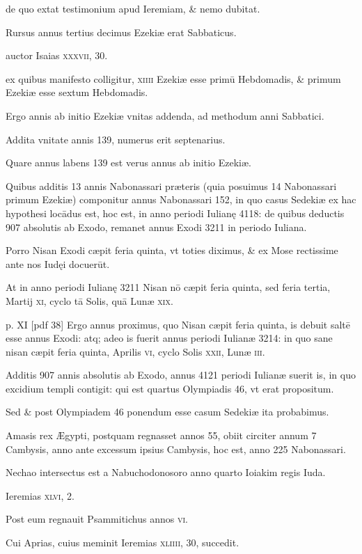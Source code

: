 \begin{parnumbers}
de quo extat testimonium
apud Ieremiam, \& nemo dubitat.

Rursus annus tertius decimus
Ezekiæ erat Sabbaticus. 

auctor Isaias \textsc{xxxvii}, 30.

ex quibus
manifesto colligitur, \textsc{xiiii} Ezekiæ esse primū Hebdomadis, \& primum
Ezekiæ esse sextum Hebdomadis. 

Ergo annis ab initio Ezekiæ vnitas addenda, ad methodum anni Sabbatici.

Addita vnitate annis
139, numerus erit septenarius. 

Quare annus labens 139 est verus
annus ab initio Ezekiæ.

Quibus additis 13 annis Nabonassari præteris
(quia posuimus 14 Nabonassari primum Ezekiæ) componitur
annus Nabonassari 152, in quo casus Sedekiæ ex hac hypothesi
locādus est, hoc est, in anno periodi Iulianę 4118: de quibus deductis
907 absolutis ab Exodo, remanet annus Exodi 3211 in periodo Iuliana.

Porro Nisan Exodi cæpit feria quinta, vt toties diximus, \& ex
Mose rectissime ante nos Iudęi docuerūt.

At in anno periodi Iulianę
3211 Nisan nō cæpit feria quinta, sed feria tertia, Martij \textsc{xi}, cyclo tā
Solis, quā Lunæ \textsc{xix}.

\clearpage
p. XI [pdf 38]
Ergo annus proximus, quo Nisan cæpit feria
quinta, is debuit saltē esse annus Exodi: atq; adeo is fuerit annus periodi
Iulianæ 3214: in quo sane nisan cæpit feria quinta, Aprilis \textsc{vi},
cyclo Solis \textsc{xxii}, Lunæ \textsc{iii}.

Additis 907 annis absolutis ab Exodo,
annus 4121 periodi Iulianæ suerit is, in quo excidium templi contigit:
qui est quartus Olympiadis 46, vt erat propositum.

Sed \& post
Olympiadem 46 ponendum esse casum Sedekiæ ita probabimus.

Amasis rex Ægypti, postquam regnasset annos 55, obiit circiter annum
7 Cambysis, anno ante excessum ipsius Cambysis, hoc est, anno
225  Nabonassari.

Nechao intersectus est a Nabuchodonosoro anno
quarto Ioiakim regis Iuda.

Ieremias \textsc{xlvi}, 2.

Post eum regnauit
Psammitichus annos \textsc{vi}.

Cui Aprias, cuius meminit Ieremias
\textsc{xliiii}, 30, succedit.


\end{parnumbers}
